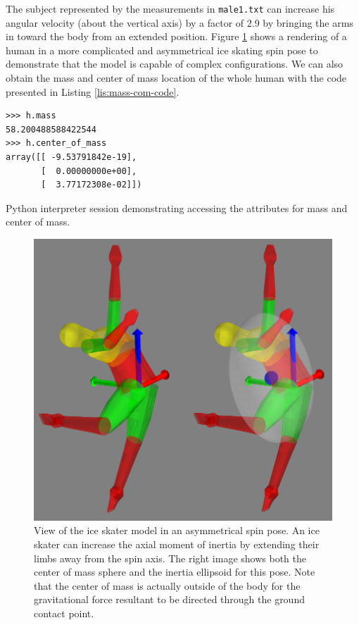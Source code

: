 \documentclass[10pt,a4paper,twocolumn]{article}
\begin{document}
The subject represented by the measurements in \verb+male1.txt+ can increase
his angular velocity (about the vertical axis) by a factor of 2.9 by bringing
the arms in toward the body from an extended position. Figure
\ref{fig:iceskater} shows a rendering of a human in a more complicated and
asymmetrical ice skating spin pose to demonstrate that the model is capable of
complex configurations. We can also obtain the mass and center of mass location
of the whole human with the code presented in Listing \ref{lis:mass-com-code}.

\begin{listing*}
  \begin{verbatim}
>>> h.mass
58.200488588422544
>>> h.center_of_mass
array([[ -9.53791842e-19],
       [  0.00000000e+00],
       [  3.77172308e-02]])
  \end{verbatim}
  \caption{Python interpreter session demonstrating accessing the attributes
    for mass and center of mass.}
  \label{lis:mass-com-code}
\end{listing*}

\begin{figure}
  \begin{center}
    \includegraphics[width=\columnwidth]{figures/ice-skater-double.png}
  \end{center}
  \caption{View of the ice skater model in an asymmetrical spin pose. An ice
    skater can increase the axial moment of inertia by extending their limbs
    away from the spin axis. The right image shows both the center of mass
    sphere and the inertia ellipsoid for this pose. Note that the center of
    mass is actually outside of the body for the gravitational force resultant
    to be directed through the ground contact point.
  }
  \label{fig:iceskater}
\end{figure}
\end{document}
